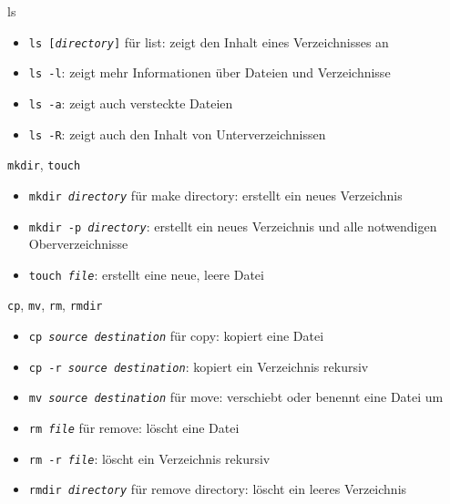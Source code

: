     \begin{frame}{ls}
      \begin{itemize}
        \item \texttt{ls [\textit{directory}]} für list: zeigt den Inhalt eines Verzeichnisses an
        \item \texttt{ls -l}: zeigt mehr Informationen über Dateien und Verzeichnisse
        \item \texttt{ls -a}: zeigt auch versteckte Dateien
        \item \texttt{ls -R}: zeigt auch den Inhalt von Unterverzeichnissen
      \end{itemize}
    \end{frame}

    \begin{frame}{\texttt{mkdir}, \texttt{touch}}
      \begin{itemize}
        \item \texttt{mkdir \textit{directory}} für make directory: erstellt ein neues Verzeichnis
        \item \texttt{mkdir -p \textit{directory}}: erstellt ein neues Verzeichnis und alle notwendigen Oberverzeichnisse
        \item \texttt{touch \textit{file}}: erstellt eine neue, leere Datei
      \end{itemize}
    \end{frame}

    \begin{frame}{\texttt{cp}, \texttt{mv}, \texttt{rm}, \texttt{rmdir}}
      \begin{itemize}
        \item \texttt{cp \textit{source} \textit{destination}} für copy: kopiert eine Datei
        \item \texttt{cp -r \textit{source} \textit{destination}}: kopiert ein Verzeichnis rekursiv
        \item \texttt{mv \textit{source} \textit{destination}} für move: verschiebt oder benennt eine Datei um
        \item \texttt{rm \textit{file}} für remove: löscht eine Datei
        \item \texttt{rm -r \textit{file}}: löscht ein Verzeichnis rekursiv
        \item \texttt{rmdir \textit{directory}} für remove directory: löscht ein leeres Verzeichnis
      \end{itemize}
    \end{frame}

